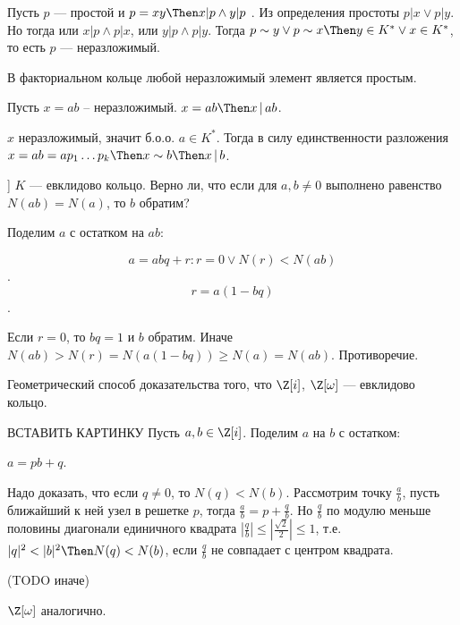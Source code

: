 \begin{solution}
Пусть \(p\) --- простой и \(p = xy \Then x | p \land y | p\) . Из определения
простоты \(p | x \lor p | y\). Но тогда или \(x | p \land p | x\), или
\(y | p \land p | y\). Тогда \(p \sim y \lor p \sim x \Then y \in K^* \lor x \in K^*\),
то есть \(p\) --- неразложимый.
\end{solution}

\begin{problem}[5 (2.8)]
В факториальном кольце любой неразложимый элемент является простым.
\end{problem}

\begin{solution}
Пусть \(x=ab\) -- неразложимый. \(x = ab \Then x\,|\,ab\).

\(x\) неразложимый, значит б.о.о. \(a\in K^*\). Тогда в силу единственности разложения
\(x = ab = ap_1\ldots p_k \Then x \sim b \Then x\,|\,b\).
\end{solution}

\begin{problem}[6 (часть 2.9) [Каргальцев]]
$K$ --- евклидово кольцо. Верно ли, что если для $a, b \ne 0$ выполнено равенство $N(ab) = N(a)$, то $b$ обратим?
\end{problem}

\begin{solution}

Поделим \(a\) с остатком на \(ab\):

\[a = abq + r: r=0 \lor N(r) < N(ab)\].
\[r = a(1 - bq)\].

Если \(r=0\), то \(bq = 1\) и \(b\) обратим. Иначе \(N(ab) > N(r) = N(a(1 - bq)) \geqslant N(a) = N(ab)\). Противоречие.
\end{solution}

\begin{problem}[7 (2.10)]
Геометрический способ доказательства того, что $\Z[i]$, $\Z[\omega]$ — евклидово кольцо.
\end{problem}

\begin{solution}
ВСТАВИТЬ КАРТИНКУ
Пусть \(a, b \in \Z[i]\). Поделим \(a\) на \(b\) с остатком:

\(a = pb + q\).

Надо доказать, что если \(q \neq 0\), то \(N(q) < N(b)\). Рассмотрим точку \(\frac{a}{b}\),
пусть ближайший к ней узел в решетке \(p\), тогда \(\frac{a}{b} = p + \frac{q}{b}\).
Но \(\frac{q}{b}\) по модулю меньше половины диагонали единичного квадрата
\(\left|\frac{q}{b}\right| \leqslant \left|\frac{\sqrt{2}}{2}\right| \leqslant 1\),
т.е. \(|q|^2 < |b|^2 \Then N(q) < N(b)\), если \(\frac{q}{b}\) не совпадает с центром квадрата.

(TODO иначе)

\(\Z[\omega]\) аналогично.
\end{solution}

